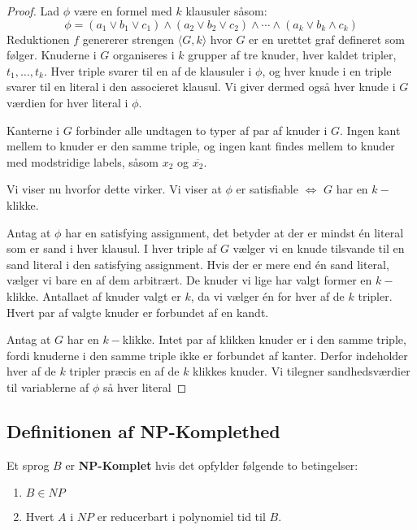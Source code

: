 \begin{proof}
  Lad $\phi$ være en formel med $k$ klausuler såsom:
  \begin{equation*}
\phi = (a_{1} \lor b_{1} \lor c_{1}) \land (a_{2} \lor b_{2} \lor c_{2}) \land \cdots \land (a_{k} \lor b_{k} \land c_{k})
  \end{equation*}
  Reduktionen $f$ genererer strengen \(\langle G,k \rangle \) hvor $G$ er en urettet graf defineret som følger.
  Knuderne i $G$ organiseres i $k$ grupper af tre knuder, hver kaldet tripler, $t_{1}, \ldots, t_{k}$. Hver triple svarer til en af de klausuler i $\phi$, og hver knude i en triple svarer til en literal i den associeret klausul. Vi giver dermed også hver knude i $G$ værdien for hver literal i $\phi$.

  Kanterne i $G$ forbinder alle undtagen to typer af par af knuder i $G$. Ingen kant mellem to knuder er den samme triple, og ingen kant findes mellem to knuder med modstridige labels, såsom $x_{2}$ og $\overline{x_{2}}$.

  Vi viser nu hvorfor dette virker. Vi viser at $\phi$ er satisfiable $\iff$ $G$ har en $k-$klikke.

  Antag at $\phi$   har en satisfying assignment, det betyder at der er mindst én literal som er sand i hver klausul. I hver triple af $G$ vælger vi en knude tilsvande til en sand literal i den satisfying assignment. Hvis der er mere end én sand literal, vælger vi bare en af dem arbitrært. De knuder vi lige har valgt former en $k-$klikke. Antallaet af knuder valgt er $k$, da vi vælger én for hver af de $k$ tripler. Hvert par af valgte knuder er forbundet af en kandt.

  Antag at $G$ har en $k-$klikke. Intet par af klikken knuder er i den samme triple, fordi knuderne i den samme triple ikke er forbundet af kanter. Derfor indeholder hver af de $k$ tripler præcis en af de $k$ klikkes knuder. Vi tilegner sandhedsværdier til variablerne af $\phi$ så hver literal

\end{proof}

\subsection{Definitionen af NP-Komplethed}%
\label{subsec:definitionofnpcompleteness}

\begin{definition}[NP-Komplethed]
  \label{def:npcomplete}
  Et sprog $B$ er \textbf{NP-Komplet} hvis det opfylder følgende to betingelser:
  \begin{enumerate}
    \item $B \in NP$
    \item Hvert $A$ i $NP$ er reducerbart i polynomiel tid til $B$.
  \end{enumerate}
\end{definition}

